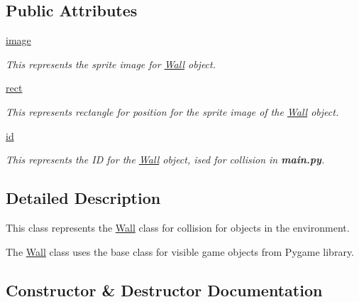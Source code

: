 \subsection*{Public Attributes}
\begin{DoxyCompactItemize}
\item 
\hyperlink{classcollision_1_1wall_1_1_wall_ac5d61504c644c284d3fb0b67e9bcc1c3}{image}
\begin{DoxyCompactList}\small\item\em This represents the sprite image for \hyperlink{classcollision_1_1wall_1_1_wall}{Wall} object. \end{DoxyCompactList}\item 
\hyperlink{classcollision_1_1wall_1_1_wall_a7bdfce57724f53f3b0879e12f2f3b78e}{rect}
\begin{DoxyCompactList}\small\item\em This represents rectangle for position for the sprite image of the \hyperlink{classcollision_1_1wall_1_1_wall}{Wall} object. \end{DoxyCompactList}\item 
\hyperlink{classcollision_1_1wall_1_1_wall_aacfb0da0a2fa307f54a571348a0df427}{id}
\begin{DoxyCompactList}\small\item\em This represents the ID for the \hyperlink{classcollision_1_1wall_1_1_wall}{Wall} object, ised for collision in {\bfseries main.\+py}. \end{DoxyCompactList}\end{DoxyCompactItemize}


\subsection{Detailed Description}
This class represents the \hyperlink{classcollision_1_1wall_1_1_wall}{Wall} class for collision for objects in the environment. 

The \hyperlink{classcollision_1_1wall_1_1_wall}{Wall} class uses the base class for visible game objects from Pygame library. 

\subsection{Constructor \& Destructor Documentation}
\mbox{\label{classcollision_1_1wall_1_1_wall_a9e55a33a1a456adb22a7dadc4f26be4c}} 
